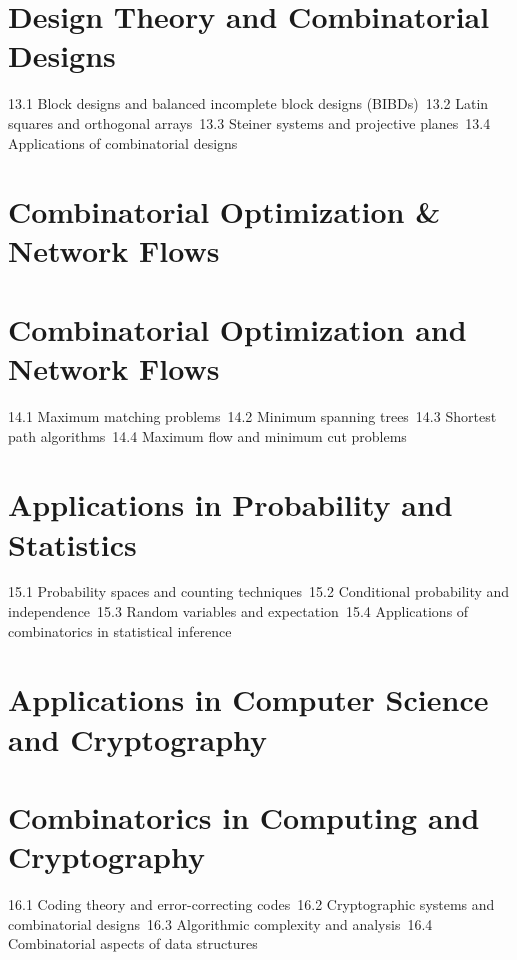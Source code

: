 \section{Design Theory and Combinatorial Designs}
13.1 Block designs and balanced incomplete block designs (BIBDs)\
13.2 Latin squares and orthogonal arrays\
13.3 Steiner systems and projective planes\
13.4 Applications of combinatorial designs\
\section{Combinatorial Optimization \& Network Flows}
\section{Combinatorial Optimization and Network Flows}
14.1 Maximum matching problems\
14.2 Minimum spanning trees\
14.3 Shortest path algorithms\
14.4 Maximum flow and minimum cut problems\
\section{Applications in Probability and Statistics}
15.1 Probability spaces and counting techniques\
15.2 Conditional probability and independence\
15.3 Random variables and expectation\
15.4 Applications of combinatorics in statistical inference\
\section{Applications in Computer Science and Cryptography}
\section{Combinatorics in Computing and Cryptography}
16.1 Coding theory and error-correcting codes\
16.2 Cryptographic systems and combinatorial designs\
16.3 Algorithmic complexity and analysis\
16.4 Combinatorial aspects of data structures\
